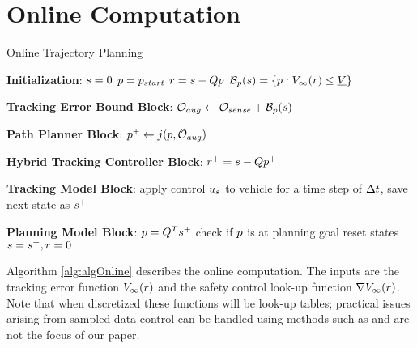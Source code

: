 \section{Online Computation \label{sec:online}}
\begin{algorithm}	
  \smaller
	\caption{Online Trajectory Planning}
	\label{alg:algOnline}
	\begin{algorithmic}[1]
		\STATE \textbf{Initialization}: \label{ln:Istart}
		\STATE $s = 0$
		\STATE $p = p_{start}$
		\STATE $r = s-Qp$
		\STATE $\mathcal B_p(s) = \{p: V_\infty(r) \le \underline{V}\}$
		 \label{ln:Iend}
		
		\STATE \textbf{Tracking Error Bound Block}: \label{ln:obsStart}
		\STATE $\mathcal{O}_{aug} \leftarrow \mathcal{O}_{sense} + \mathcal B_p(s)$ \label{ln:obsEnd}
		
		\STATE \textbf{Path Planner Block}:\label{ln:plannerStart}
		\STATE $p^+ \leftarrow j(p, \mathcal{O}_{aug})$\label{ln:plannerEnd}
		
		\STATE \textbf{Hybrid Tracking Controller Block}:\label{ln:controllerStart}
		\STATE $r^+ = s - Qp^+$
		
		\ELSE {} 
           \ENDIF \label{ln:controllerEnd}
		
		\STATE \textbf{Tracking Model Block}: \label{ln:trackingStart}
		\STATE apply control $u_s$ to vehicle for a time step of $\Delta t$, save next state as $s^+$ \label{ln:trackingEnd}
		
		\STATE \textbf{Planning Model Block}:\label{ln:planningStart}
		\STATE $p = Q^Ts^+$
		\STATE check if $p$ is at planning goal
		\STATE reset states $s = s^+, r = 0$ \label{ln:planningEnd}
		\ENDWHILE
	\end{algorithmic}
\end{algorithm}
Algorithm \ref{alg:algOnline} describes the online computation. The inputs are the tracking error function $V_\infty(r)$ and the safety control look-up function $\nabla V_\infty(r)$. Note that when discretized these functions will be look-up tables; practical issues arising from sampled data control can be handled using methods such as \cite{Mitchell2012, Mitchell13, Dabadie2014} and are not the focus of our paper.

